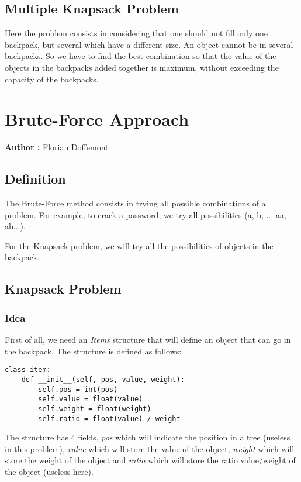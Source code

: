 \documentclass[12pt]{article}
\begin{document}
    \subsection{Multiple Knapsack Problem}
        Here the problem consists in considering that one should not fill only one backpack, but several which have a different size. An object cannot be in several backpacks. So we have to find the best combination so that the value of the objects in the backpacks added together is maximum, without exceeding the capacity of the backpacks.

\section{Brute-Force Approach}

    \textbf{Author :} Florian Doffemont

    \subsection{Definition}
        The Brute-Force method consists in trying all possible combinations of a problem. For example, to crack a password, we try all possibilities (a, b, ... aa, ab...).

        For the Knapsack problem, we will try all the possibilities of objects in the backpack.
    
    \subsection{Knapsack Problem}
    
        \subsubsection{Idea}
            First of all, we need an \emph{Items} structure that will define an object that can go in the backpack. The structure is defined as follows:

            \begin{lstlisting}
class item:
    def __init__(self, pos, value, weight):
        self.pos = int(pos)
        self.value = float(value)
        self.weight = float(weight)
        self.ratio = float(value) / weight
            \end{lstlisting}
            
            The structure has 4 fields, \emph{pos} which will indicate the position in a tree (useless in this problem), \emph{value} which will store the value of the object, \emph{weight} which will store the weight of the object and \emph{ratio} which will store the ratio value/weight of the object (useless here).\newline
\end{document}
